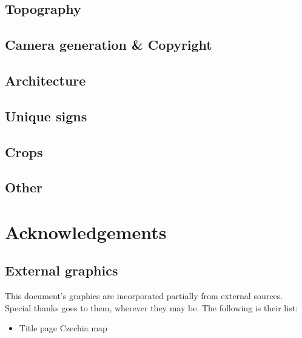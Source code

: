 \documentclass[12pt, oneside]{article}
\begin{document}
\subsection{Topography}

\subsection{Camera generation \& Copyright}


\subsection{Architecture}

\subsection{Unique signs}


\subsection{Crops}

\subsection{Other}



\newpage
\section{Acknowledgements}
\label{sec:ack}

\subsection{External graphics}

This document's graphics are incorporated partially from external sources. Special thanks goes to them, wherever they may be. The following is their list:

\begin{itemize}
  \item Title page Czechia map\cite{gr1}
\end{itemize}
\end{document}
